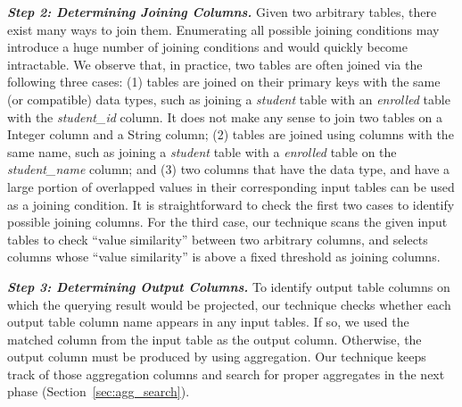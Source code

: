 \vspace{1mm}
\noindent\textit{\textbf{Step 2: Determining Joining Columns. }} Given two arbitrary tables, there exist many
ways to join them. Enumerating all possible joining conditions may introduce a huge number of joining
conditions and would quickly become intractable. We observe that, in practice, two tables are often joined via the following
three cases: (1) tables are joined on their primary keys with the same (or compatible) data types, such
as joining a \textit{student} table with an \textit{enrolled} table with the \textit{student\_id} column. It does not
make any sense to join two tables on a Integer column and a String column; (2) tables are joined
using columns with the same name, such as joining a \textit{student} table with a \textit{enrolled} table on the
\textit{student\_name} column; and (3) two columns that have the data type, and have a large portion of
overlapped values in their corresponding input tables can be used as a joining condition. It is straightforward to check the first 
two cases to identify possible joining columns. For the third case, our technique scans the given input tables to check ``value similarity''
between two arbitrary columns, and selects columns whose ``value similarity'' is above a fixed threshold as joining columns.

\vspace{1mm}
\noindent \textit{\textbf{Step 3: Determining Output Columns.}} To identify output table columns on
which the querying result would be projected, our technique checks whether each output
table column name appears in any input tables. If so, we used the matched column
from the input table as the output column. Otherwise, the output column
must be produced by using aggregation. Our technique keeps track of those aggregation columns
and search for proper aggregates in the next phase (Section~\ref{sec:agg_search}). 


\vspace{1mm}

